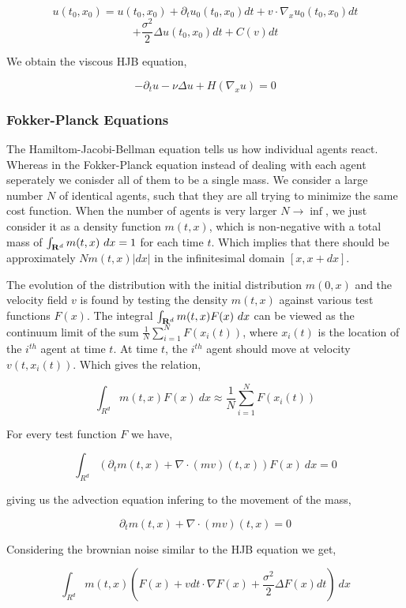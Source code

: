 \documentclass[a4paper, 10pt, conference]{ieeeconf}      %
\begin{document}
$$\displaystyle u(t_0,x_0) = u(t_0,x_0) + \partial_t u_0(t_0,x_0) dt + v \cdot \nabla_x u_0(t_0,x_0) dt$$
$$\displaystyle + \frac{\sigma^2}{2} \Delta u(t_0,x_0) dt + C(v) dt$$

We obtain the viscous HJB equation,

$$\displaystyle -\partial_t u - \nu \Delta u + H(\nabla_x u) = 0$$

\subsubsection{Fokker-Planck Equations}

\hfil \break

The Hamiltom-Jacobi-Bellman equation tells us how individual agents react. Whereas in the Fokker-Planck equation instead of dealing with each agent seperately we conisder all of them to be a single mass\cite{b8}. We consider a large number $N$ of identical agents, such that they are all trying to minimize the same cost function. When the number of agents is very larger $N \rightarrow \inf$, we just consider it as a density function $m(t,x)$, which is non-negative with a total mass of ${\int_{{\bf R}^d} m(t,x)\ dx = 1}$ for each time $t$. Which implies that there should be approximately ${N m(t,x) |dx|}$ in the infinitesimal domain ${[x,x+dx]}$.

The evolution of the distribution with the initial distribution $m(0,x)$ and the velocity field $v$ is found by testing the density $m(t,x)$ against various test functions $F(x)$. The integral ${\int_{{\bf R}^d} m(t,x) F(x) \ dx}$ can be viewed as the continuum limit of the sum ${\frac{1}{N} \sum_{i=1}^N F(x_i(t))}$, where ${x_i(t)}$ is the location of the ${i^{th}}$ agent at time ${t}$. At time ${t}$, the ${i^{th}}$ agent should move at velocity ${v(t,x_i(t))}$. Which gives the relation,

$$\displaystyle \int_{{R}^d} m(t,x) F(x)\ dx \approx \frac{1}{N} \sum_{i=1}^N F(x_i(t))$$

For every test function $F$ we have,

$$\displaystyle \int_{{R}^d} (\partial_t m(t,x) + \nabla\cdot (mv)(t,x)) F(x)\ dx = 0$$

giving us the advection equation infering to the movement of the mass,

$$\displaystyle \partial_t m(t,x) + \nabla\cdot (mv)(t,x) = 0$$

Considering the brownian noise similar to the HJB equation we get,

$$\displaystyle \int_{{R}^d} m(t,x) (F(x) + v dt \cdot \nabla F(x) + \frac{\sigma^2}{2} \Delta F(x) dt)\ dx$$
\end{document}
